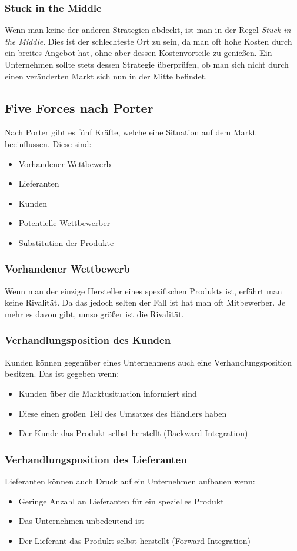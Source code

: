 \documentclass{article}
\begin{document}
  \subsubsection{Stuck in the Middle}
  Wenn man keine der anderen Strategien abdeckt, ist man in der Regel \textit{Stuck in the Middle}. Dies ist der schlechteste Ort zu sein, da man oft hohe Kosten durch ein breites Angebot hat, ohne aber dessen Kostenvorteile zu genießen. Ein Unternehmen sollte stets dessen Strategie überprüfen, ob man sich nicht durch einen veränderten Markt sich nun in der Mitte befindet.

  \subsection{Five Forces nach Porter}
  Nach Porter gibt es fünf Kräfte, welche eine Situation auf dem Markt beeinflussen. Diese sind:
  \begin{itemize}
    \item{Vorhandener Wettbewerb}
    \item{Lieferanten}
    \item{Kunden}
    \item{Potentielle Wettbewerber}
    \item{Substitution der Produkte}
  \end{itemize}
  \subsubsection{Vorhandener Wettbewerb}
  Wenn man der einzige Hersteller eines spezifischen Produkts ist, erfährt man keine Rivalität. Da das jedoch selten der Fall ist hat man oft Mitbewerber. Je mehr es davon gibt, umso größer ist die Rivalität.
  \subsubsection{Verhandlungsposition des Kunden}
  Kunden können gegenüber eines Unternehmens auch eine Verhandlungsposition besitzen. Das ist gegeben wenn:
  \begin{itemize}
    \item{Kunden über die Marktusituation informiert sind}
    \item{Diese einen großen Teil des Umsatzes des Händlers haben}
    \item{Der Kunde das Produkt selbst herstellt (Backward Integration)}
  \end{itemize}
  \subsubsection{Verhandlungsposition des Lieferanten}
  Lieferanten können auch Druck auf ein Unternehmen aufbauen wenn:
  \begin{itemize}
    \item{Geringe Anzahl an Lieferanten für ein spezielles Produkt}
    \item{Das Unternehmen unbedeutend ist}
    \item{Der Lieferant das Produkt selbst herstellt (Forward Integration)}
  \end{itemize}
\end{document}
